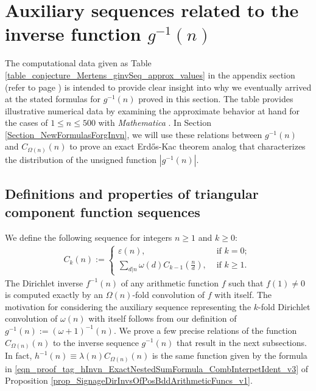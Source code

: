 \documentclass[11pt,reqno,a4letter]{article}
\numberwithin{figure}{section}
\numberwithin{table}{section}
\theoremstyle{plain}
\numberwithin{theorem}{section}
\theoremstyle{definition}
\begin{document}
\newpage
\section{Auxiliary sequences related to the inverse function $g^{-1}(n)$} 
\label{Section_InvFunc_PreciseExpsAndAsymptotics} 

The computational data given as Table \ref{table_conjecture_Mertens_ginvSeq_approx_values} 
in the appendix section (refer to 
page \pageref{table_conjecture_Mertens_ginvSeq_approx_values}) is intended to 
provide clear insight into why we eventually arrived at the stated formulas for  
$g^{-1}(n)$ proved in this section. The table provides illustrative 
numerical data by examining the approximate behavior 
at hand for the cases of $1 \leq n \leq 500$ with \emph{Mathematica} 
\cite{SCHMIDT-MERTENS-COMPUTATIONS}. 
In Section \ref{Section_NewFormulasForgInvn}, 
we will use these relations between $g^{-1}(n)$ and 
$C_{\Omega(n)}(n)$ to prove an exact Erd\H{o}s-Kac theorem analog that characterizes 
the distribution of the unsigned function $|g^{-1}(n)|$. 

\subsection{Definitions and properties of triangular component function sequences} 

We define the following sequence for integers $n \geq 1$ and $k \geq 0$: 
\begin{align} 
\label{eqn_CknFuncDef_v2} 
C_k(n) := \begin{cases} 
     \varepsilon(n), & \text{ if $k = 0$; } \\ 
     \sum\limits_{d|n} \omega(d) C_{k-1}\left(\frac{n}{d}\right), & \text{ if $k \geq 1$. } 
     \end{cases} 
\end{align} 
The Dirichlet 
inverse $f^{-1}(n)$ of any arithmetic function $f$ such that $f(1) \neq 0$ is 
computed exactly by an $\Omega(n)$-fold convolution of $f$ with itself. 
The motivation for considering the auxiliary sequence representing the $k$-fold 
Dirichlet convolution of $\omega(n)$ with itself follows from our definition of 
$g^{-1}(n) := (\omega+1)^{-1}(n)$. 
We prove a few precise relations of the function $C_{\Omega(n)}(n)$ to the inverse 
sequence $g^{-1}(n)$ that result in the next subsections. 
In fact, 
$h^{-1}(n) \equiv \lambda(n) C_{\Omega(n)}(n)$ is the same function given by 
the formula in \eqref{eqn_proof_tag_hInvn_ExactNestedSumFormula_CombInterpetIdent_v3} of 
Proposition \ref{prop_SignageDirInvsOfPosBddArithmeticFuncs_v1}. 
\end{document}
